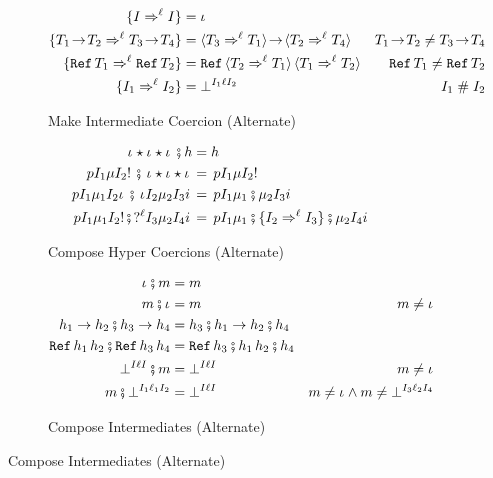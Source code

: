 \documentclass[acmtog, authorversion, acmlarge]{acmart}
\begin{document}
\begin{figure}[tbh]
\begin{subfigure}{.35\textwidth}
    \label{fig:makeCoercion}
  \end{subfigure}%
  \begin{subfigure}{.65\textwidth}
    \begin{align*}
      \mkIcrcn{\I}{\I}   &= \id\\
      \mkIcrcn{\Fn[\!]{\T_{1}}{\T_{2}}}{\Fn[\!]{\T_{3}}{\T_{4}}} %
      &= \fn[\!]{\mkcrcn{\T_{3}}{\T_{1}}}{\mkcrcn{\T_{2}}{\T_{4}}}
      & \Fn[\!]{\T_{1}}{\T_{2}} \neq \Fn[\!]{\T_{3}}{\T_{4}} \\
      \mkIcrcn{\Ref{\T_1}}{\Ref{\T_2}} %
      &= \rf{\mkcrcn{\T_{2}}{\T_{1}}}{\mkcrcn{\T_{1}}{\T_{2}}} %
      & \Ref{\T_1} \neq \Ref{\T_2} \\
      \mkIcrcn{\I_1}{\I_2} &= \failed{\I_1}{\Lbl}{\I_2} %
      & \I_1 \sic \I_2
    \end{align*}
    \caption{Make Intermediate Coercion (Alternate)}
    \label{fig:makeIntCoercion}
  \end{subfigure}
  \begin{subfigure}{.5\textwidth}
    \begin{align*}
      \cmp{\hc{\pmt}{\Dyn}{\id}{\Dyn}{\imt}}{\HC} &= \HC \\
      \cmp{\hc{\Prj}{\I_1}{\Med}{\I_2}{\inj}} %
          {\hc{\pmt}{\Dyn}{\id}{\Dyn}{\imt}} %
      &=  \hc{\Prj}{\I_1}{\Med}{\I_2}{\inj} \\
      \cmp{\hc{\Prj}{\I_1}{\Med_1}{\I_2}{\imt}} %
          {\hc{\pmt}{\I_2}{\Med_2}{\I_3}{\Inj}} %
      &=  \hc{\Prj}{\I_1}{\cmpm{\Med_1}{\Med_2}}{\I_3}{\Inj} \\
      \cmp{\hc{\Prj}{\I_1}{\Med_1}{\I_2}{\inj}} %
          {\hc{\prj{\Lbl}}{\I_3}{\Med_2}{\I_4}{\Inj}} %
      &=  \hc{\Prj}{\I_1}{\cmpm{\cmpm{\Med_1}{\mkIcrcn{\I_2}{\I_3}}}{\Med_2}}{\I_4}{\Inj} %
    \end{align*}
    \caption{Compose Hyper Coercions (Alternate)}
    \label{fig:composeHC}
  \end{subfigure}%
  \begin{subfigure}{.5\textwidth}
    \begin{align*}
      \cmpm{\id}{m} &= m\\
      \cmpm{m}{\id} &= m & m \neq \id \\
      \cmpm{\fn{\HC_1}{\HC_2}}{\fn{\HC_3}{\HC_4}} %
      &= \fn{\cmp{\HC_3}{\HC_1}}{\cmp{\HC_2}{\HC_4}}\\
      \cmpm{\rf{\HC_1}{\HC_2}}{\rf{\HC_3}{\HC_4}} %
      &= \rf{\cmp{\HC_3}{\HC_1}}{\cmp{\HC_2}{\HC_4}}\\
      \cmpm{\failed{\I}{\Lbl}{\I}}{m} &= \failed{\I}{\Lbl}{\I} %
      & m \neq \id \\
      \cmpm{m}{\failed{\I_1}{\Lbl_1}{\I_2}} &= \failed{\I}{\Lbl}{\I} %
      & m \neq \id \wedge m \neq \failed{\I_3}{\Lbl_2}{\I_4}
    \end{align*}
    \caption{Compose Intermediates (Alternate)}
    \label{fig:composeMed}
  \end{subfigure}
\end{figure}
\end{document}
